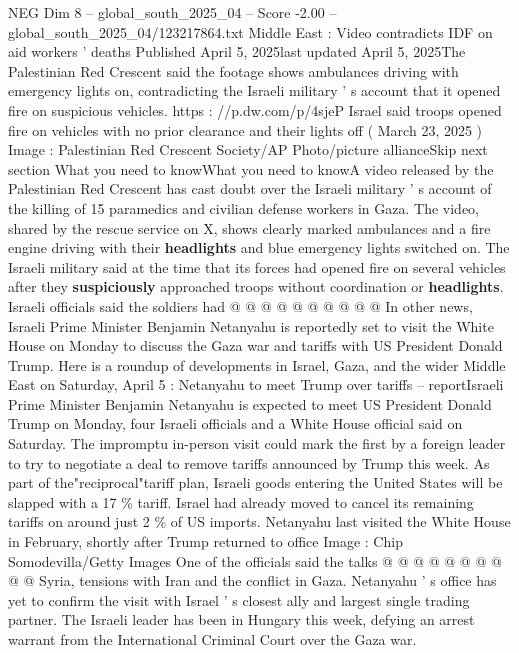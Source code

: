 \begin{textsample}{NEG Dim 8 – global\_south\_2025\_04 – Score -2.00 – global\_south\_2025\_04/123217864.txt}  \label{ex:f8_neg_043}
Middle East : Video contradicts IDF on aid workers ' deaths Published April 5, 2025last updated April 5, 2025The Palestinian Red Crescent said the footage shows ambulances driving with emergency lights on, contradicting the Israeli military ' s account that it opened fire on suspicious vehicles. https : //p.dw.com/p/4sjeP Israel said troops opened fire on vehicles with no prior clearance and their lights off ( March 23, 2025 ) Image : Palestinian Red Crescent Society/AP Photo/picture allianceSkip next section What you need to knowWhat you need to knowA video released by the Palestinian Red Crescent has cast doubt over the Israeli military ' s account of the killing of 15 paramedics and civilian defense workers in Gaza.
The video, shared by the rescue service on X, shows clearly marked ambulances and a fire engine driving with their \textbf{headlights} and blue emergency lights switched on.
The Israeli military said at the time that its forces had opened fire on several vehicles after they \textbf{suspiciously} approached troops without coordination or \textbf{headlights}.
Israeli officials said the soldiers had @ @ @ @ @ @ @ @ @ @ In other news, Israeli Prime Minister Benjamin Netanyahu is reportedly set to visit the White House on Monday to discuss the Gaza war and tariffs with US President Donald Trump.
Here is a roundup of developments in Israel, Gaza, and the wider Middle East on Saturday, April 5 : Netanyahu to meet Trump over tariffs -- reportIsraeli Prime Minister Benjamin Netanyahu is expected to meet US President Donald Trump on Monday, four Israeli officials and a White House official said on Saturday.
The impromptu in-person visit could mark the first by a foreign leader to try to negotiate a deal to remove tariffs announced by Trump this week.
As part of the"reciprocal"tariff plan, Israeli goods entering the United States will be slapped with a 17 \% tariff.
Israel had already moved to cancel its remaining tariffs on around just 2 \% of US imports.
Netanyahu last visited the White House in February, shortly after Trump returned to office Image : Chip Somodevilla/Getty Images One of the officials said the talks @ @ @ @ @ @ @ @ @ @ Syria, tensions with Iran and the conflict in Gaza.
Netanyahu ' s office has yet to confirm the visit with Israel ' s closest ally and largest single trading partner.
The Israeli leader has been in Hungary this week, defying an arrest warrant from the International Criminal Court over the Gaza war.

\end{textsample}
